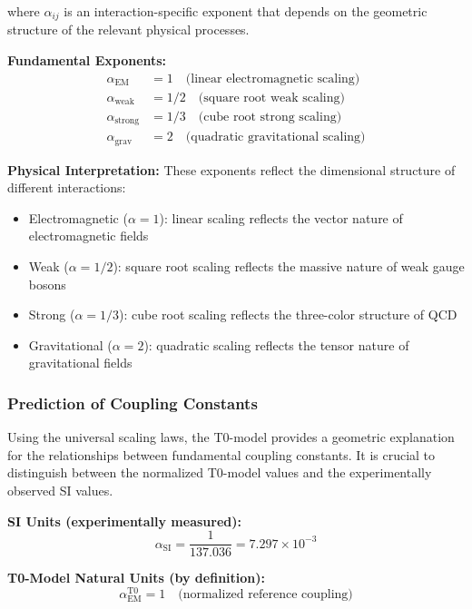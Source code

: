 \documentclass[12pt,a4paper]{article}
\begin{document}
	where $\alpha_{ij}$ is an interaction-specific exponent that depends on the geometric structure of the relevant physical processes.
	
	\textbf{Fundamental Exponents:}
	\begin{align}
		\alpha_{\text{EM}} &= 1 \quad \text{(linear electromagnetic scaling)} \\
		\alpha_{\text{weak}} &= 1/2 \quad \text{(square root weak scaling)} \\
		\alpha_{\text{strong}} &= 1/3 \quad \text{(cube root strong scaling)} \\
		\alpha_{\text{grav}} &= 2 \quad \text{(quadratic gravitational scaling)}
	\end{align}
	
	\textbf{Physical Interpretation:} These exponents reflect the dimensional structure of different interactions:
	\begin{itemize}
		\item Electromagnetic ($\alpha = 1$): linear scaling reflects the vector nature of electromagnetic fields
		\item Weak ($\alpha = 1/2$): square root scaling reflects the massive nature of weak gauge bosons
		\item Strong ($\alpha = 1/3$): cube root scaling reflects the three-color structure of QCD
		\item Gravitational ($\alpha = 2$): quadratic scaling reflects the tensor nature of gravitational fields
	\end{itemize}
	
\subsubsection{Prediction of Coupling Constants}

Using the universal scaling laws, the T0-model provides a geometric explanation for the relationships between fundamental coupling constants. It is crucial to distinguish between the normalized T0-model values and the experimentally observed SI values.

\textbf{SI Units (experimentally measured):}
\begin{equation}
	\alpha_{\text{SI}} = \frac{1}{137.036} = 7.297 \times 10^{-3}
\end{equation}

\textbf{T0-Model Natural Units (by definition):}
\begin{equation}
	\alpha_{\text{EM}}^{\text{T0}} = 1 \quad \text{(normalized reference coupling)}
\end{equation}
\end{document}
